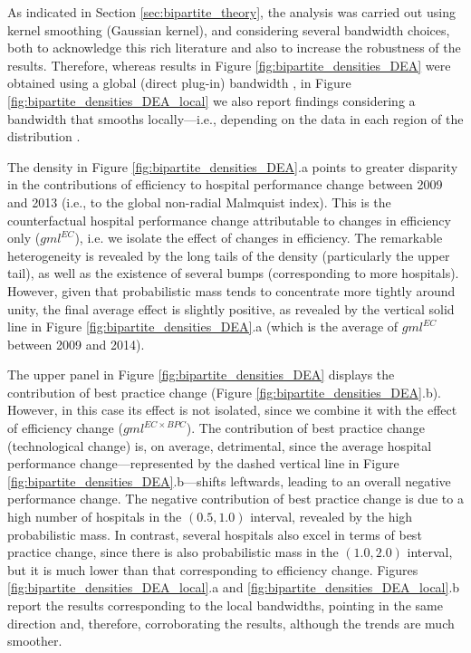 \documentclass[11pt,a4paper,oneside]{article}
\begin{document}
As indicated in Section \ref{sec:bipartite_theory}, the analysis was carried out using kernel smoothing (Gaussian kernel), and considering several bandwidth choices, both to acknowledge this rich literature and also to increase the robustness of the results. Therefore, whereas results in Figure \ref{fig:bipartite_densities_DEA} were obtained using a global (direct plug-in) bandwidth \citep{sheatherjones}, in Figure \ref{fig:bipartite_densities_DEA_local} we also report findings considering a bandwidth that smooths locally---i.e., depending on the data in each region of the distribution \citep{loader1996local.annals}.






The density in Figure \ref{fig:bipartite_densities_DEA}.a points to greater disparity in the contributions of efficiency to hospital performance change between 2009 and 2013 (i.e., to the global non-radial Malmquist index). This is the counterfactual hospital performance change attributable to changes in efficiency only ($gml^{EC}$), i.e. we isolate the effect of changes in efficiency. The remarkable heterogeneity is revealed by the long tails of the density (particularly the upper tail), as well as the existence of several bumps (corresponding to more hospitals). However, given that probabilistic mass tends to concentrate more tightly around unity, the final average effect is slightly positive, as revealed by the vertical solid line in Figure \ref{fig:bipartite_densities_DEA}.a (which is the average of $gml^{EC}$ between 2009 and 2014).




The upper panel in Figure \ref{fig:bipartite_densities_DEA} displays the contribution of best practice change (Figure \ref{fig:bipartite_densities_DEA}.b). However, in this case its effect is not isolated, since we combine it with the effect of efficiency change ($gml^{EC \times BPC}$). The contribution of best practice change (technological change) is, on average, detrimental, since the average hospital performance change---represented by the dashed vertical line in Figure \ref{fig:bipartite_densities_DEA}.b---shifts leftwards, leading to an overall negative performance change. The negative contribution of best practice change is due to a high number of hospitals in the $(0.5, 1.0)$ interval, revealed by the high probabilistic mass. In contrast, several hospitals also excel in terms of best practice change, since there is also probabilistic mass in the $(1.0,2.0)$ interval, but it is much lower than that corresponding to efficiency change. Figures \ref{fig:bipartite_densities_DEA_local}.a and \ref{fig:bipartite_densities_DEA_local}.b report the results corresponding to the local bandwidths, pointing in the same direction and, therefore, corroborating the results, although the trends are much smoother.
\end{document}
